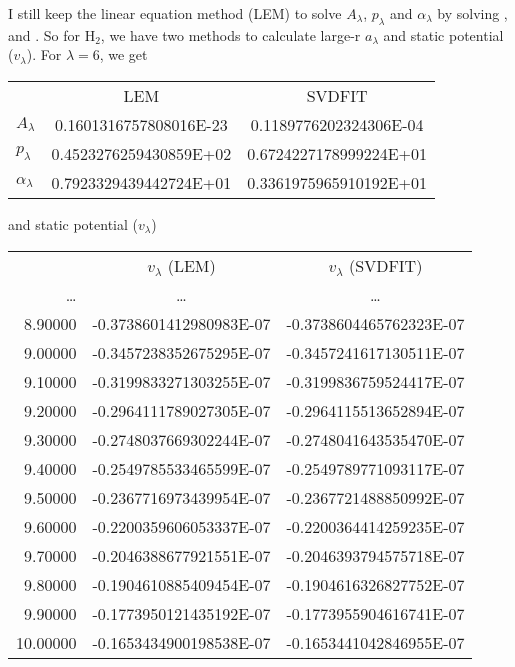 \documentclass[aps,pra,groupedaddress,
                amsfonts,amssymb,
                preprint
    ]{revtex4}
\begin{document}
I still keep the linear equation method (LEM) to solve $A_\lambda$,
$p_\lambda$ and $\alpha_\lambda$ by solving ,  and
. So for H$_2$, we have two methods to calculate large-r
$a_\lambda$ and static potential ($v_\lambda$). For $\lambda=6$, we get
\begin{center}
\begin{tabular}{lcc}
                 & LEM & SVDFIT \\
     $A_\lambda$ & \quad 0.1601316757808016E-23  & \quad 0.1189776202324306E-04 \\
     $p_\lambda$ & \quad 0.4523276259430859E+02  & \quad 0.6724227178999224E+01 \\
$\alpha_\lambda$ & \quad 0.7923329439442724E+01  & \quad 0.3361975965910192E+01
\end{tabular}
\end{center}
and static potential ($v_\lambda$)
\begin{center}
\begin{tabular}{rcc}
                     & $v_\lambda$ (LEM) & $v_\lambda$ (SVDFIT) \\
   \ldots  &  \ldots      & \ldots         \\
   8.90000 &  \quad -0.3738601412980983E-07 &   \quad  -0.3738604465762323E-07  \\
   9.00000 &  \quad -0.3457238352675295E-07 &   \quad  -0.3457241617130511E-07  \\
   9.10000 &  \quad -0.3199833271303255E-07 &   \quad  -0.3199836759524417E-07  \\
   9.20000 &  \quad -0.2964111789027305E-07 &   \quad  -0.2964115513652894E-07  \\
   9.30000 &  \quad -0.2748037669302244E-07 &   \quad  -0.2748041643535470E-07  \\
   9.40000 &  \quad -0.2549785533465599E-07 &   \quad  -0.2549789771093117E-07  \\
   9.50000 &  \quad -0.2367716973439954E-07 &   \quad  -0.2367721488850992E-07  \\
   9.60000 &  \quad -0.2200359606053337E-07 &   \quad  -0.2200364414259235E-07  \\
   9.70000 &  \quad -0.2046388677921551E-07 &   \quad  -0.2046393794575718E-07  \\
   9.80000 &  \quad -0.1904610885409454E-07 &   \quad  -0.1904616326827752E-07  \\
   9.90000 &  \quad -0.1773950121435192E-07 &   \quad  -0.1773955904616741E-07  \\
  10.00000 &  \quad -0.1653434900198538E-07 &   \quad  -0.1653441042846955E-07  

\end{tabular}
\end{center}


\end{document}
